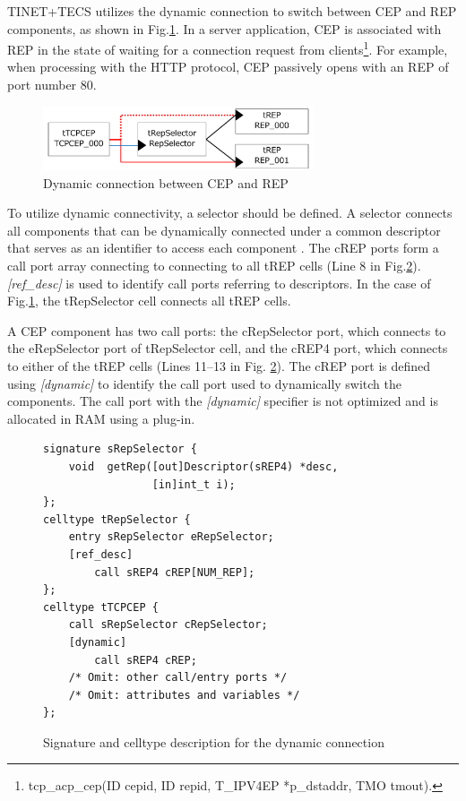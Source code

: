 \documentclass[JIP]{ipsj_v2/UTF8/ipsj}
\begin{document}
TINET+TECS utilizes the dynamic connection to switch between CEP and REP components, as shown in Fig.\ref{fig:DynamicConnectionUseCase}.
In a server application, CEP is associated with REP in the state of waiting for a connection request from clients\footnote{tcp\_acp\_cep(ID cepid, ID repid, T\_IPV4EP *p\_dstaddr, TMO tmout).}.
For example, when processing with the HTTP protocol, CEP passively opens with an REP of port number 80.

\begin{figure}[t]
    \centering
    \includegraphics[width=8.0cm,clip]{figure/DynamicConnectionUseCase.pdf}
    \caption{Dynamic connection between CEP and REP}
    \label{fig:DynamicConnectionUseCase}
\end{figure}

To utilize dynamic connectivity, a selector should be defined.
A selector connects all components that can be dynamically connected under a common descriptor that serves as an identifier to access each component \cite{par:optimization}.
The cREP ports form a call port array connecting to connecting to all tREP cells (Line 8 in Fig.\ref{src:DynamicCDLcode}).
{\it [ref\_desc]} is used to identify call ports referring to descriptors. 
In the case of Fig.\ref{fig:DynamicConnectionUseCase}, the tRepSelector cell connects all tREP cells.

A CEP component has two call ports: the cRepSelector port, which connects to the eRepSelector port of tRepSelector cell, and the cREP4 port, which connects to either of the tREP cells (Lines 11--13 in Fig. \ref{src:DynamicCDLcode}).
The cREP port is defined using {\it [dynamic]} to identify the call port used to dynamically switch the components.
The call port with the {\it [dynamic]} specifier is not optimized and is allocated in RAM using a plug-in.

\begin{figure}[t]
\centering
\begin{lstlisting}
signature sRepSelector {
    void  getRep([out]Descriptor(sREP4) *desc,
                 [in]int_t i);
};
celltype tRepSelector {
    entry sRepSelector eRepSelector;
    [ref_desc]
        call sREP4 cREP[NUM_REP];
};
celltype tTCPCEP {
    call sRepSelector cRepSelector;
    [dynamic]
        call sREP4 cREP;
    /* Omit: other call/entry ports */
    /* Omit: attributes and variables */
};
\end{lstlisting}
\caption{Signature and celltype description for the dynamic connection}
\label{src:DynamicCDLcode}
\end{figure}
\end{document}
